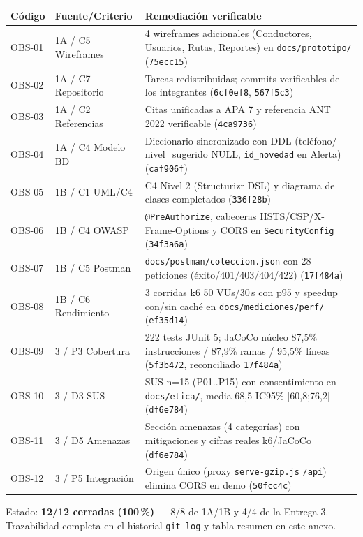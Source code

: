 \begin{longtable}{p{1.4cm}p{2.2cm}p{8.5cm}}
\toprule
\textbf{Código} & \textbf{Fuente/Criterio} & \textbf{Remediación verificable} \\
\midrule
OBS-01 & 1A / C5 Wireframes & 4 wireframes adicionales (Conductores, Usuarios, Rutas, Reportes) en \texttt{docs/prototipo/} (\texttt{75ecc15}) \\
OBS-02 & 1A / C7 Repositorio & Tareas redistribuidas; commits verificables de los integrantes (\texttt{6cf0ef8}, \texttt{567f5c3}) \\
OBS-03 & 1A / C2 Referencias & Citas unificadas a APA 7 y referencia ANT 2022 verificable (\texttt{4ca9736}) \\
OBS-04 & 1A / C4 Modelo BD & Diccionario sincronizado con DDL (teléfono/ nivel\_sugerido NULL, \texttt{id\_novedad} en Alerta) (\texttt{caf906f}) \\
OBS-05 & 1B / C1 UML/C4 & C4 Nivel 2 (Structurizr DSL) y diagrama de clases completados (\texttt{336f28b}) \\
OBS-06 & 1B / C4 OWASP & \texttt{@PreAuthorize}, cabeceras HSTS/CSP/X-Frame-Options y CORS en \texttt{SecurityConfig} (\texttt{34f3a6a}) \\
OBS-07 & 1B / C5 Postman & \texttt{docs/postman/coleccion.json} con 28 peticiones (éxito/401/403/404/422) (\texttt{17f484a}) \\
OBS-08 & 1B / C6 Rendimiento & 3 corridas k6 50 VUs/30\,s con p95 y speedup con/sin caché en \texttt{docs/mediciones/perf/} (\texttt{ef35d14}) \\
OBS-09 & 3 / P3 Cobertura & 222 tests JUnit 5; JaCoCo núcleo 87,5\% instrucciones / 87,9\% ramas / 95,5\% líneas (\texttt{5f3b472}, reconciliado \texttt{17f484a}) \\
OBS-10 & 3 / D3 SUS & SUS n=15 (P01..P15) con consentimiento en \texttt{docs/etica/}, media 68,5 IC95\% [60,8;76,2] (\texttt{df6e784}) \\
OBS-11 & 3 / D5 Amenazas & Sección amenazas (4 categorías) con mitigaciones y cifras reales k6/JaCoCo (\texttt{df6e784}) \\
OBS-12 & 3 / P5 Integración & Origen único (proxy \texttt{serve-gzip.js} \texttt{/api}) elimina CORS en demo (\texttt{50fcc4c}) \\
\bottomrule
\end{longtable}

\noindent Estado: \textbf{12/12 cerradas (100\,\%)} — 8/8 de 1A/1B y 4/4 de la Entrega 3. Trazabilidad completa en el historial \texttt{git log} y tabla-resumen en este anexo.
